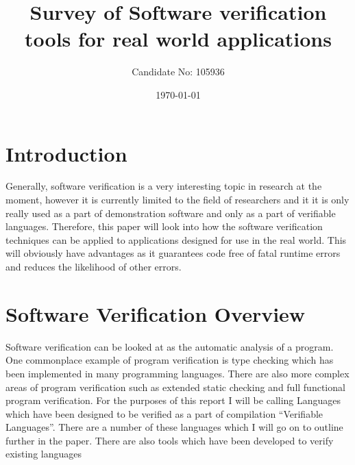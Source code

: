 \documentclass[a4paper,12pt]{scrartcl}
\title{Survey of Software verification tools for real world applications}
\author{Candidate No: 105936}
\date{\today}
\begin{document}
	
	\begin{titlepage}
		\maketitle
	\end{titlepage}
	
	\tableofcontents
	\newpage
	\section{Introduction}
	{
		Generally, software verification is a very interesting topic in research at the moment, however it is currently limited to the field of researchers and it it is only really used as a part of demonstration software and only as a part of verifiable languages. Therefore, this paper will look into how the software verification techniques can be applied to applications designed for use in the real world. This will obviously have advantages as it guarantees code free of fatal runtime errors and reduces the likelihood of other errors.
	}

	\section{Software Verification Overview}
	{
		Software verification can be looked at as the automatic analysis of a program. One commonplace example of program verification is type checking which has been implemented in many programming languages. There are also more complex areas of program verification such as extended static checking and full functional program verification. For the purposes of this report I will be calling Languages which have been designed to be verified as a part of compilation \enquote{Verifiable Languages}. There are a number of these languages which I will go on to outline further in the paper. There are also tools which have been developed to verify existing languages
	}
	
\end{document}
